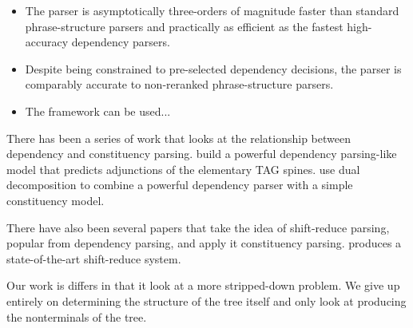 \documentclass[11pt,letterpaper]{article}
\begin{document}
\begin{itemize}
\item The parser is asymptotically three-orders of magnitude faster than
standard phrase-structure parsers and practically as efficient as the fastest
high-accuracy dependency parsers.

\item Despite being constrained to pre-selected dependency decisions,
the parser is comparably accurate to non-reranked phrase-structure parsers.

\item The framework can be used...


\end{itemize}














There has been a series of work that looks at the relationship
between dependency and constituency parsing. \cite{carreras2008tag}
build a powerful dependency parsing-like model that predicts
adjunctions of the elementary TAG spines. \cite{rush2010dual} use
dual decomposition to combine a powerful dependency parser with
a simple constituency model.

There have also been several papers that take the idea of
shift-reduce parsing, popular from dependency parsing, and apply
 it constituency parsing. \cite{zhu2013fast} produces a state-of-the-art shift-reduce
system.

Our work is differs in that it look at a more stripped-down problem.
We give up entirely on determining the structure of the tree itself and only
look at  producing the nonterminals of the tree.

\end{document}
